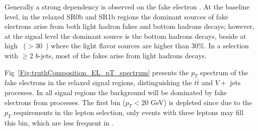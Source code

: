 Generally a strong dependency is observed on the fake electron \pt. 
At the baseline level, in the relaxed SR0b and SR1b regions 
the dominant sources of fake electrons arise from both light hadron fakes and bottom hadrons decays; 
however, at the signal level the dominant source is the bottom hadrons decays, beside at high \pt\ ($>$30~\GeV) where the light flavor sources are higher than 30\%. In a selection with $\ge 2$ $b$-jets, most of the fakes arise from light hadrons decays.

Fig~\ref{Fig:truthComposition_EL_pT_spectrum} presents the $p_T$ spectrum of the fake electrons in the relaxed signal regions, 
distinguishing the $t\bar t$ and $V+$ jets processes. 
In all signal regions the background will be dominated by fake electrons from \ttbar processes. 
The first \pt bin ($p_T<20$ GeV) is depleted since due to the $p_T$ requirements in the lepton selection, 
only events with three leptons may fill this bin, which are less frequent in \ttbar. 

